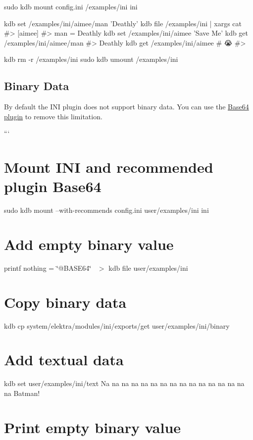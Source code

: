 \begin{DoxyCode}
sudo kdb mount config.ini /examples/ini ini

kdb set /examples/ini/aimee/man 'Deathly'
kdb file /examples/ini | xargs cat
#> [aimee]
#> man = Deathly
kdb set /examples/ini/aimee 'Save Me'
kdb get /examples/ini/aimee/man
#> Deathly
kdb get /examples/ini/aimee # 😭
#>

kdb rm -r /examples/ini
sudo kdb umount /examples/ini
\end{DoxyCode}


\subsection*{Binary Data}

By default the I\+NI plugin does not support binary data. You can use the \hyperlink{md_src_plugins_base64_README_src_plugins_base64_README_md}{Base64 plugin} to remove this limitation.

``` \section*{Mount I\+NI and recommended plugin Base64}

sudo kdb mount --with-\/recommends config.\+ini user/examples/ini ini

\section*{Add empty binary value}

printf \textquotesingle{}nothing = \char`\"{}@\+B\+A\+S\+E64\char`\"{}~\newline
\textquotesingle{} $>$ {\ttfamily kdb file user/examples/ini} \section*{Copy binary data}

kdb cp system/elektra/modules/ini/exports/get user/examples/ini/binary \section*{Add textual data}

kdb set user/examples/ini/text \textquotesingle{}Na na na na na na na na na na na na na na na na Batman!\textquotesingle{}

\section*{Print empty binary value}

